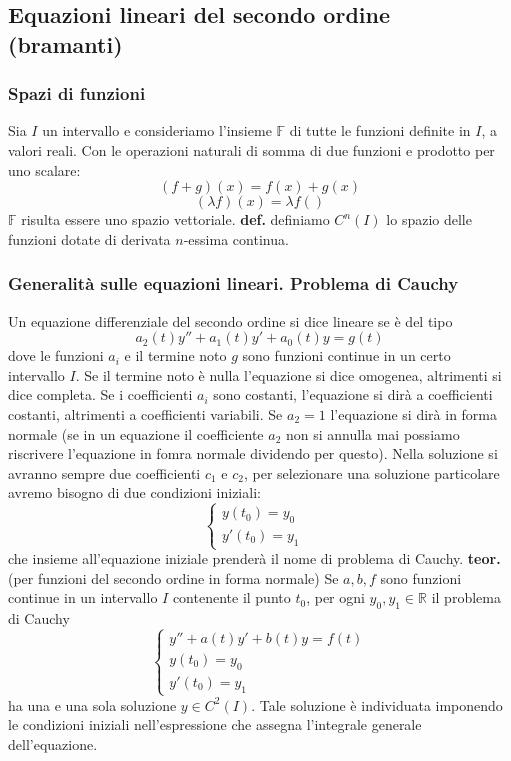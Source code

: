 \subsection{Equazioni lineari del secondo ordine (bramanti)}
\subsubsection{Spazi di funzioni}
Sia $I$ un intervallo e consideriamo l'insieme $\mathbb{F}$ di tutte le funzioni definite in $I$, a valori reali. Con le operazioni naturali di somma di due funzioni e prodotto per uno scalare:
\[
    (f+g)(x) = f(x) + g(x)
\]
\[
    (\lambda f)(x) = \lambda f()
\]
$\mathbb{F}$ risulta essere uno spazio vettoriale. \newline
\newline
\textbf{def.} definiamo $C^n(I)$ lo spazio delle funzioni dotate di derivata $n$-essima continua.
\subsubsection{Generalità sulle equazioni lineari. Problema di Cauchy}
Un equazione differenziale del secondo ordine si dice lineare se è del tipo
\[
    a_2(t) y'' + a_1(t) y' +a_0(t) y = g(t)
\]
dove le funzioni $a_i$ e il termine noto $g$ sono funzioni continue in un certo intervallo $I$.\newline
Se il termine noto è nulla l'equazione si dice omogenea, altrimenti si dice completa.\newline
Se i coefficienti $a_i$ sono costanti, l'equazione si dirà a coefficienti costanti, altrimenti a coefficienti variabili.\newline
Se $a_2 = 1$ l'equazione si dirà in forma normale (se in un equazione il coefficiente $a_2$ non si annulla mai possiamo riscrivere l'equazione in fomra normale dividendo per questo).\newline
\newline
Nella soluzione si avranno sempre due coefficienti $c_1$ e $c_2$, per selezionare una soluzione particolare avremo bisogno di due condizioni iniziali:
\[
    \begin{cases}
        y(t_0) = y_0&\\
        y'(t_0) = y_1
    \end{cases}
\]
che insieme all'equazione iniziale prenderà il nome di problema di Cauchy.\newline
\newline
\textbf{teor.} (per funzioni del secondo ordine in forma normale)\newline
Se $a, b, f$ sono funzioni continue in un intervallo $I$ contenente il punto $t_0$, per ogni $y_0, y_1 \in \mathbb{R}$ il problema di Cauchy
\[
    \begin{cases}
        y'' + a(t) y' + b(t) y = f(t)\\
        y(t_0) = y_0\\
        y'(t_0) = y_1
    \end{cases}
\]
ha una e una sola soluzione $y \in C^2(I)$.\newline
Tale soluzione è individuata imponendo le condizioni iniziali nell'espressione che assegna l'integrale generale dell'equazione.
